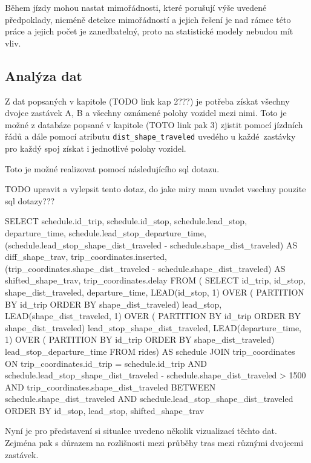 \bigbreak

Během jízdy mohou nastat mimořádnosti, které porušují výše uvedené předpoklady, nicméně detekce mimořádností a jejich řešení je nad rámec této práce a jejich počet je zanedbatelný, proto na statistické modely nebudou mít vliv.


\subsection{Analýza dat}

Z dat popsaných v kapitole (TODO link kap 2???) je potřeba získat všechny dvojce zastávek A, B a všechny oznámené polohy vozidel mezi nimi. Toto je možné z databáze popsané v kapitole (TOTO link pak 3) zjistit pomocí jízdních řádů a dále pomocí atributu \verb-dist_shape_traveled- uvedého u každé zastávky pro každý spoj získat i jednotlivé polohy vozidel.

\bigbreak

Toto je možné realizovat pomocí následujícího \gls{sql} dotazu.

TODO upravit a vylepsit tento dotaz, do jake miry mam uvadet vsechny pouzite sql dotazy???
\begin{code}[frame=none]
SELECT schedule.id_trip,
	schedule.id_stop,
	schedule.lead_stop, 
	departure_time,
	schedule.lead_stop_departure_time,
	(schedule.lead_stop_shape_dist_traveled - schedule.shape_dist_traveled)
		AS diff_shape_trav,
	trip_coordinates.inserted,
	(trip_coordinates.shape_dist_traveled - schedule.shape_dist_traveled)
		AS shifted_shape_trav,
	trip_coordinates.delay
FROM (
	SELECT id_trip, id_stop, shape_dist_traveled, departure_time,
		LEAD(id_stop, 1) OVER (
			PARTITION BY id_trip ORDER BY shape_dist_traveled) lead_stop,
		LEAD(shape_dist_traveled, 1) OVER (
			PARTITION BY id_trip ORDER BY shape_dist_traveled) lead_stop_shape_dist_traveled,
		LEAD(departure_time, 1) OVER (
			PARTITION BY id_trip ORDER BY shape_dist_traveled) lead_stop_departure_time
	FROM rides) AS schedule
JOIN trip_coordinates
ON trip_coordinates.id_trip = schedule.id_trip AND
	schedule.lead_stop_shape_dist_traveled - schedule.shape_dist_traveled > 1500 AND
	trip_coordinates.shape_dist_traveled BETWEEN schedule.shape_dist_traveled AND
	schedule.lead_stop_shape_dist_traveled
ORDER BY id_stop, lead_stop, shifted_shape_trav
\end{code}

\bigbreak

Nyní je pro představení si situalce uvedeno několik vizualizací těchto dat. Zejména pak s důrazem na rozlišnosti mezi průběhy tras mezi různými dvojcemi zastávek.

